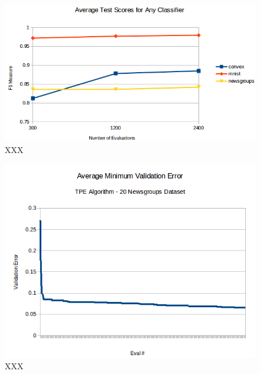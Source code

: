 \documentclass[wcp]{jmlr}
\begin{document}
\begin{figure}
    \centering
    \includegraphics[width=\textwidth]{graphics/scores_per_eval}
    \caption{
	    XXX
    }
    \label{fig:per_eval}
\end{figure}

\begin{figure}
    \centering
    \includegraphics[width=\textwidth]{graphics/AvgMinValidErrorTPE}
    \caption{
	    XXX
    }
    \label{fig:errtpe}
\end{figure}
\end{document}
